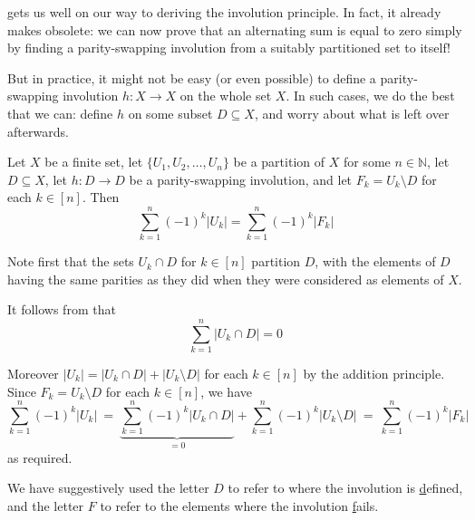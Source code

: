 gets us well on our way to deriving the involution principle. In fact, it already makes  obsolete: we can now prove that an alternating sum is equal to zero simply by finding a parity-swapping involution from a suitably partitioned set to itself!

But in practice, it might not be easy (or even possible) to define a parity-swapping involution $h : X \to X$ on the whole set $X$. In such cases, we do the best that we can: define $h$ on some subset $D \subseteq X$, and worry about what is left over afterwards.

\begin{theorem}
\label{thmInvolutionPrinciple}
Let $X$ be a finite set, let $\{ U_1, U_2, \dots, U_n \}$ be a partition of $X$ for some $n \in \mathbb{N}$, let $D \subseteq X$, let $h : D \to D$ be a parity-swapping involution, and let $F_k = U_k \setminus D$ for each $k \in [n]$. Then
\[ \sum_{k=1}^n (-1)^k |U_k| = \sum_{k=1}^n (-1)^k |F_k| \]
\end{theorem}

\begin{cproof}
Note first that the sets $U_k \cap D$ for $k \in [n]$ partition $D$, with the elements of $D$ having the same parities as they did when they were considered as elements of $X$.

It follows from  that
\[ \sum_{k=1}^n |U_k \cap D| = 0 \]

Moreover $|U_k| = |U_k \cap D| + |U_k \setminus D|$ for each $k \in [n]$ by the addition principle. Since $F_k = U_k \setminus D$ for each $k \in [n]$, we have
\[ \sum_{k=1}^n (-1)^k |U_k| ~=~ \underbrace{\sum_{k=1}^n (-1)^k |U_k \cap D|}_{=0} + \sum_{k=1}^n (-1)^k |U_k \setminus D| ~=~ \sum_{k=1}^n (-1)^k |F_k| \]
as required.
\end{cproof}

We have suggestively used the letter $D$ to refer to where the involution is \underline{d}efined, and the letter $F$ to refer to the elements where the involution \underline{f}ails.

